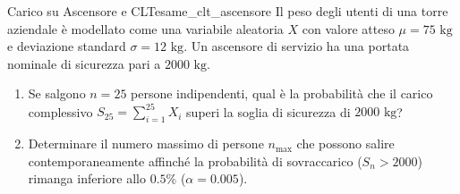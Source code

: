 \begin{esercizio}{Carico su Ascensore e CLT}{esame_clt_ascensore}
Il peso degli utenti di una torre aziendale è modellato come una variabile aleatoria $X$ con valore atteso $\mu = 75\text{ kg}$ e deviazione standard $\sigma = 12\text{ kg}$. Un ascensore di servizio ha una portata nominale di sicurezza pari a $2000\text{ kg}$.
\begin{enumerate}
    \item Se salgono $n = 25$ persone indipendenti, qual è la probabilità che il carico complessivo $S_{25} = \sum_{i=1}^{25} X_i$ superi la soglia di sicurezza di $2000\text{ kg}$?
    \item Determinare il numero massimo di persone $n_{\max}$ che possono salire contemporaneamente affinché la probabilità di sovraccarico ($S_n > 2000$) rimanga inferiore allo $0.5\%$ ($\alpha = 0.005$).
\end{enumerate}
\end{esercizio}

